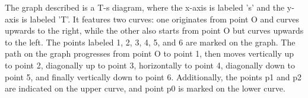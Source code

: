 The graph described is a T-s diagram, where the x-axis is labeled 's' and the y-axis is labeled 'T'. It features two curves: one originates from point O and curves upwards to the right, while the other also starts from point O but curves upwards to the left. The points labeled 1, 2, 3, 4, 5, and 6 are marked on the graph. The path on the graph progresses from point O to point 1, then moves vertically up to point 2, diagonally up to point 3, horizontally to point 4, diagonally down to point 5, and finally vertically down to point 6. Additionally, the points p1 and p2 are indicated on the upper curve, and point p0 is marked on the lower curve.